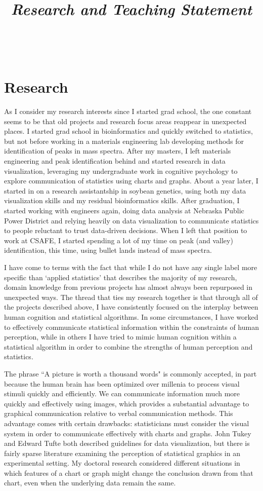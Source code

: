 \documentclass[12pt, letterpaper, sans]{moderncv}
\title{\emph{Research and Teaching Statement}}
\makeatletter
\newcommand{\makesimpletitle}{%
  \recomputeletterlengths%

  \begin{varwidth}[c]{.75\textwidth}
  \if@left\raggedright\fi%
      \if@right\raggedleft\fi%
      \ifthenelse{\equal{\@title}{}}{}{\titlestyle{\@title}}%
  \end{varwidth}\hfill
  \begin{varwidth}[c]{.25\textwidth}%
      \raggedleft%
      \addressfont\textcolor{color2}{%
        {\bfseries\upshape\@firstname~\@lastname}\\
        \ifthenelse{\isundefined{\@addressstreet}}{}{\makenewline\addresssymbol\@addressstreet%
          \ifthenelse{\equal{\@addresscity}{}}{}{\makenewline\@addresscity}%
          \ifthenelse{\equal{\@addresscountry}{}}{}{\makenewline\@addresscountry}}%
        \collectionloop{phones}{%
          \makenewline\csname\collectionloopkey phonesymbol\endcsname\collectionloopitem}%
        \ifthenelse{\isundefined{\@email}}{}{\makenewline\emailsymbol\emaillink{\@email}}%
        \ifthenelse{\isundefined{\@homepage}}{}{\makenewline\homepagesymbol\httplink{\@homepage}}%
        \ifthenelse{\isundefined{\@extrainfo}}{}{\makenewline\@extrainfo}}
    \end{varwidth}
}
\makeatother
\begin{document}
\makesimpletitle

\section{Research}

As I consider my research interests since I started grad school, the one constant seems to be that old projects and research focus areas reappear in unexpected places. I started grad school in bioinformatics and quickly switched to statistics, but not before working in a materials engineering lab developing methods for identification of peaks in mass spectra. After my masters, I left materials engineering and peak identification behind and started research in data visualization, leveraging my undergraduate work in cognitive psychology to explore communication of statistics using charts and graphs. About a year later, I started in on a research assistantship in soybean genetics, using both my data visualization skills and my residual bioinformatics skills. After graduation, I started working with engineers again, doing data analysis at Nebraska Public Power District and relying heavily on data visualization to communicate statistics to people reluctant to trust data-driven decisions. When I left that position to work at CSAFE, I started spending a lot of my time on peak (and valley) identification, this time, using bullet lands instead of mass spectra. 

I have come to terms with the fact that while I do not have any single label more specific than `applied statistics' that describes the majority of my research, domain knowledge from previous projects has almost always been repurposed in unexpected ways. The thread that ties my research together is that through all of the projects described above, I have consistently focused on the interplay between human cognition and statistical algorithms. In some circumstances, I have worked to effectively communicate statistical information within the constraints of human perception, while in others I have tried to mimic human cognition within a statistical algorithm in order to combine the strengths of human perception and statistics. 

The phrase ``A picture is worth a thousand words" is commonly accepted, in part because the human brain has been optimized over millenia to process visual stimuli quickly and efficiently. We can communicate information much more quickly and effectively using images, which provides a substantial advantage to graphical communication relative to verbal communication methods. This advantage comes with certain drawbacks: statisticians must consider the visual system in order to communicate effectively with charts and graphs. John Tukey and Edward Tufte both described guidelines for data visualization, but there is fairly sparse literature examining the perception of statistical graphics in an experimental setting. My doctoral research considered different situations in which features of a chart or graph might change the conclusion drawn from that chart, even when the underlying data remain the same.
\end{document}
